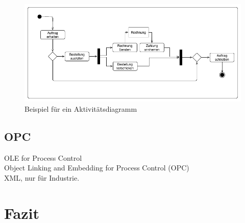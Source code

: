 \begin{figure}[hbt!]
 \centering
  \includegraphics[width=1\textwidth]{graphics/stateoftheart/Activity_bsp}
  \caption{Beispiel für ein Aktivitätsdiagramm}
\end{figure}
%
\subsection{OPC}
OLE for Process Control\\
Object Linking and Embedding for Process Control (OPC)\\
XML, nur für Industrie.
\section{Fazit}
